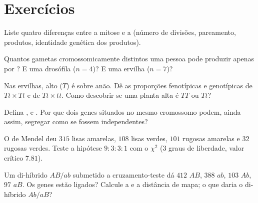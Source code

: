 \section{Exercícios}

\begin{exercise}[$\star$]\label{exo:b2:meiosis-heredity:1}
Liste quatro diferenças entre a mitose e a  (número de divisões,
pareamento, produtos, identidade genética dos produtos).
\end{exercise}

\begin{exercise}[$\star$]\label{exo:b2:meiosis-heredity:2}
Quantos gametas cromossomicamente distintos uma pessoa pode produzir
apenas por ? E uma drosófila ($n = 4$)? E uma
ervilha ($n =
7$)?
\end{exercise}

\begin{exercise}[$\star$]\label{exo:b2:meiosis-heredity:3}
Nas ervilhas, alto ($T$) é  sobre anão. Dê as proporções
fenotípicas e genotípicas de $Tt \times Tt$ e de $Tt \times tt$. Como
descobrir se uma planta alta é $TT$ ou $Tt$?
\end{exercise}

\begin{exercise}[$\star$]\label{exo:b2:meiosis-heredity:4}
Defina ,  e . Por
que dois genes situados no mesmo cromossomo podem, ainda assim,
segregar como se fossem independentes?
\end{exercise}

\begin{exercise}[$\star\star$]\label{exo:b2:meiosis-heredity:5}
O  de Mendel deu $315$ lisas amarelas, $108$
lisas verdes, $101$ rugosas amarelas e $32$ rugosas verdes. Teste a
hipótese $9 : 3 : 3 :
1$ com o $\chi^2$ (3 graus de liberdade, valor crítico
$7.81$).
\end{exercise}

\begin{exercise}[$\star\star$]\label{exo:b2:meiosis-heredity:6}
Um di-híbrido $AB/ab$ submetido a cruzamento-teste dá $412$ $AB$,
$388$ $ab$, $103$
$Ab$, $97$ $aB$. Os genes estão ligados? Calcule a  e a distância de mapa; o que daria o di-híbrido $Ab/aB$?
\end{exercise}

